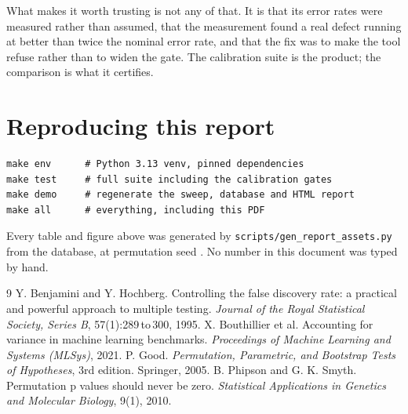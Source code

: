 \documentclass[11pt,a4paper]{report}
\begin{document}
What makes it worth trusting is not any of that. It is that its error rates were
measured rather than assumed, that the measurement found a real defect running at
better than twice the nominal error rate, and that the fix was to make the tool
refuse rather than to widen the gate. The calibration suite is the product; the
comparison is what it certifies.

\appendix
\chapter{Reproducing this report}

\begin{verbatim}
make env      # Python 3.13 venv, pinned dependencies
make test     # full suite including the calibration gates
make demo     # regenerate the sweep, database and HTML report
make all      # everything, including this PDF
\end{verbatim}

Every table and figure above was generated by
\texttt{scripts/gen\_report\_assets.py} from the database, at permutation seed
\factpermutationseed{}. No number in this document was typed by hand.

\begin{thebibliography}{9}
 Y. Benjamini and Y. Hochberg. Controlling the false discovery
  rate: a practical and powerful approach to multiple testing. \emph{Journal of
  the Royal Statistical Society, Series B}, 57(1):289\,to\,300, 1995.
 X. Bouthillier et al. Accounting for variance in
  machine learning benchmarks. \emph{Proceedings of Machine Learning and Systems
  (MLSys)}, 2021.
 P. Good. \emph{Permutation, Parametric, and Bootstrap Tests of
  Hypotheses}, 3rd edition. Springer, 2005.
 B. Phipson and G. K. Smyth. Permutation p values should
  never be zero. \emph{Statistical Applications in Genetics and Molecular
  Biology}, 9(1), 2010.
\end{thebibliography}
\end{document}
